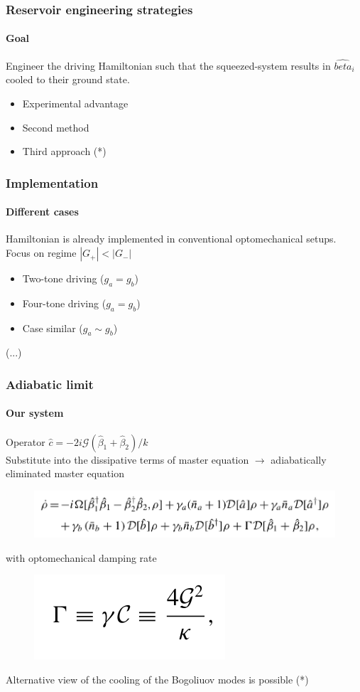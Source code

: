 \documentclass[aspectratio=43]{beamer}
\begin{document}
\begin{frame}

	\frametitle{Reservoir engineering strategies}
	\framesubtitle{Goal}
	
	Engineer the driving Hamiltonian such that the squeezed-system results in $\hat{beta}_{i}$ cooled to their ground state.
	\begin{itemize}
		\item Experimental advantage
		\item Second method
		\item Third approach (*)
	\end{itemize}	

\end{frame}

\begin{frame}

	\frametitle{Implementation}
	\framesubtitle{Different cases}
	
	Hamiltonian is already implemented in conventional optomechanical setups. Focus on regime $|G_{+}|<|G_{-}|$
	
	\begin{itemize}
		\item Two-tone driving ($g_{a} = g_{b}$)
		\item Four-tone driving ($g_{a} = g_{b}$)
		\item Case similar ($g_{a} \sim g_{b}$)
	\end{itemize}	
	
	(...)

\end{frame}


\begin{frame}
	
	\frametitle{Adiabatic limit}
	\framesubtitle{Our system}
	
	Operator  $\hat{c} = -2i\mathcal{G}(\hat{\beta}_{1} + \hat{\beta}_{2})/k$\\
	Substitute into the dissipative terms of master equation $\longrightarrow$ adiabatically eliminated master equation
	\begin{figure}
		\includegraphics[width = 9 cm]{plots/master_eq_2.png}
	\end{figure}

	with optomechanical damping rate
	\begin{figure}
		\includegraphics[width = 3 cm]{plots/optomechanic_dumping.png}
	\end{figure}
	
	Alternative view of the cooling of the Bogoliuov modes is possible (*)

\end{frame}
\end{document}
